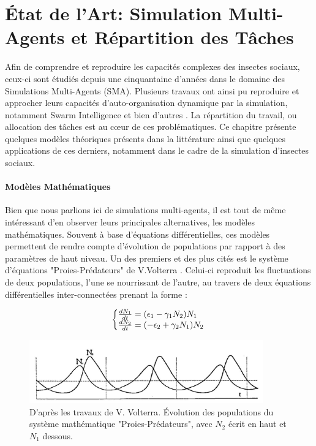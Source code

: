 \chapter{État de l'Art: Simulation Multi-Agents et Répartition des Tâches}
\label{ChapitreEASMA}

	Afin de comprendre et reproduire les capacités complexes des insectes sociaux, ceux-ci sont étudiés depuis une cinquantaine d'années dans le domaine des Simulations Multi-Agents (SMA). Plusieurs travaux ont ainsi pu reproduire et approcher leurs capacités d'auto-organisation dynamique par la simulation, notamment Swarm Intelligence \cite{bonabeau_natural_1999} et bien d'autres \cite{drogoul_simulation_1993, schmickl_taskselsim_2008, dornhaus_task_1998}. La répartition du travail, ou allocation des tâches est au cœur de ces problématiques. Ce chapitre présente quelques modèles théoriques présents dans la littérature ainsi que quelques applications de ces derniers, notamment dans le cadre de la simulation d'insectes sociaux.
	
    \subsubsection*{Modèles Mathématiques}
		Bien que nous parlions ici de simulations multi-agents, il est tout de même intéressant d'en observer leurs principales alternatives, les modèles mathématiques. Souvent à base d'équations différentielles, ces modèles permettent de rendre compte d'évolution de populations par rapport à des paramètres de haut niveau. Un des premiers et des plus cités est le système d'équations "Proies-Prédateurs" de V.Volterra \cite{volterra_variations_1928}. Celui-ci reproduit les fluctuations de deux populations, l'une se nourrissant de l'autre, au travers de deux équations différentielles inter-connectées prenant la forme :
		
		\begin{equation}
  			\left\{\begin{array}{@{}l@{}}
    			\frac{dN_1}{dt}=(\epsilon_1-\gamma_1 N_2) N_1\\
      			\frac{dN_2}{dt}=(- \epsilon_2 + \gamma_2 N_1) N_2
  			\end{array}\right.\,
		\end{equation}
		
		\begin{figure}
		\centering
		\includegraphics[width=0.9\textwidth]{./Pictures/Graphs/Volterra.JPG}
		\caption{D'après les travaux de V. Volterra\cite{volterra_variations_1928}. Évolution des populations du système mathématique "Proies-Prédateurs", avec $N_2$ écrit en haut et $N_1$ dessous.}
		\label{volterra}
		\end{figure}
		
